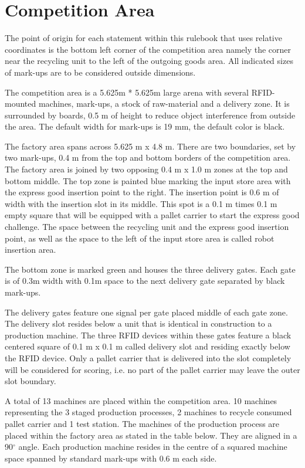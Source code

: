 \documentclass[12pt,twoside]{article}
\begin{document}
\section{Competition Area}

The point of origin for each statement within this rulebook that uses
relative coordinates is the bottom left corner of the competition area
namely the corner near the recycling unit to the left of the outgoing
goods area. All indicated sizes of mark-ups are to be considered
outside dimensions.

The competition area is a 5.625m * 5.625m large arena with several
RFID-mounted machines, mark-ups, a stock of raw-material and a
delivery zone. It is surrounded by boards, 0.5 m of height to reduce
object interference from outside the area. The default width for
mark-ups is 19 mm, the default color is black.

The factory area spans across 5.625 m x 4.8 m. There are two
boundaries, set by two mark-ups, 0.4 m from the top and bottom borders
of the competition area. The factory area is joined by two opposing
0.4 m x 1.0 m zones at the top and bottom middle. The top zone is
painted blue marking the input store area with the express good
insertion point to the right. The insertion point is 0.6 m of width
with the insertion slot in its middle. This spot is a 0.1 m times 0.1
m empty square that will be equipped with a pallet carrier to start
the express good challenge. The space between the recycling unit and
the express good insertion point, as well as the space to the left of
the input store area is called robot insertion area.

The bottom zone is marked green and houses the three delivery gates.
Each gate is of 0.3m width with 0.1m space to the next delivery gate
separated by black mark-ups.

The delivery gates feature one signal per gate placed middle of each
gate zone. The delivery slot resides below a unit that is identical in
construction to a production machine. The three RFID devices within
these gates feature a black centered square of 0.1 m x 0.1 m called
delivery slot and residing exactly below the RFID device. Only a
pallet carrier that is delivered into the slot completely will be
considered for scoring, i.e. no part of the pallet carrier may leave
the outer slot boundary.

A total of 13 machines are placed within the competition area. 10
machines representing the 3 staged production processes, 2 machines to
recycle consumed pallet carrier and 1 test station. The machines of
the production process are placed within the factory area as stated in
the table below. They are aligned in a 90$^\circ$ angle. Each production
machine resides in the centre of a squared machine space spanned by
standard mark-ups with 0.6 m each side.
\end{document}
